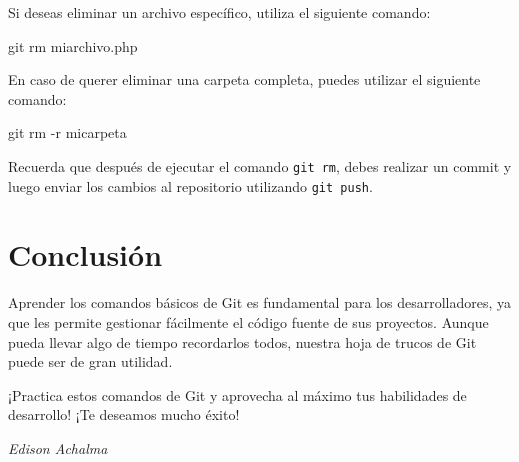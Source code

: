 \documentclass[
  a4paper,
]{article}
\newenvironment{Shaded}{}{}
\newcommand{\AttributeTok}[1]{\textcolor[rgb]{0.84,0.23,0.29}{#1}}
\newcommand{\FunctionTok}[1]{\textcolor[rgb]{0.44,0.26,0.76}{#1}}
\newcommand{\NormalTok}[1]{\textcolor[rgb]{0.14,0.16,0.18}{#1}}
\begin{document}
Si deseas eliminar un archivo específico, utiliza el siguiente comando:

\begin{Shaded}
\begin{Highlighting}[]
\FunctionTok{git}\NormalTok{ rm miarchivo.php}
\end{Highlighting}
\end{Shaded}

En caso de querer eliminar una carpeta completa, puedes utilizar el
siguiente comando:

\begin{Shaded}
\begin{Highlighting}[]
\FunctionTok{git}\NormalTok{ rm }\AttributeTok{{-}r}\NormalTok{ micarpeta}
\end{Highlighting}
\end{Shaded}

Recuerda que después de ejecutar el comando \texttt{git\ rm}, debes
realizar un commit y luego enviar los cambios al repositorio utilizando
\texttt{git\ push}.

\section{Conclusión}\label{conclusiuxf3n}

Aprender los comandos básicos de Git es fundamental para los
desarrolladores, ya que les permite gestionar fácilmente el código
fuente de sus proyectos. Aunque pueda llevar algo de tiempo recordarlos
todos, nuestra hoja de trucos de Git puede ser de gran utilidad.

¡Practica estos comandos de Git y aprovecha al máximo tus habilidades de
desarrollo! ¡Te deseamos mucho éxito!

\emph{Edison Achalma}


\printbibliography
\end{document}

